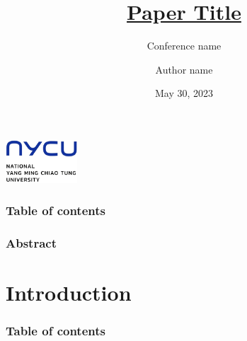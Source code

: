\documentclass{beamer}
\title[Paper]{\href{https://arxiv.org/abs/2005.11401}{Paper Title}} %
\subtitle{Conference name}
\author{Author name} %
\institute[National Yang Ming Chiao Tung University, Hsinchu] %
{
Speaker: Your name
}
\date{May 30, 2023} %
\begin{document}
\begin{frame}
\titlepage %
\includegraphics[width=0.2\textwidth]{logo/en_nycu.png}
\end{frame}

\begin{frame}
\frametitle{Table of contents} %
\tableofcontents[hideallsubsections] %
\end{frame}


\begin{frame}
\frametitle{Abstract}

\end{frame}


\section{Introduction} %

\begin{frame}
\frametitle{Table of contents} %
\tableofcontents[	currentsection,
	currentsubsection, 
	hideothersubsections, 
	sectionstyle=show/shaded, ] %
\end{frame}
\end{document}
